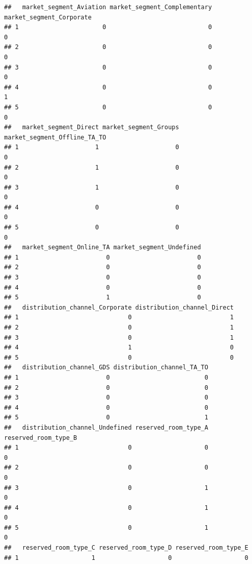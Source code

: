 \documentclass[
]{article}
\begin{document}
\begin{verbatim}
##   market_segment_Aviation market_segment_Complementary market_segment_Corporate
## 1                       0                            0                        0
## 2                       0                            0                        0
## 3                       0                            0                        0
## 4                       0                            0                        1
## 5                       0                            0                        0
##   market_segment_Direct market_segment_Groups market_segment_Offline_TA_TO
## 1                     1                     0                            0
## 2                     1                     0                            0
## 3                     1                     0                            0
## 4                     0                     0                            0
## 5                     0                     0                            0
##   market_segment_Online_TA market_segment_Undefined
## 1                        0                        0
## 2                        0                        0
## 3                        0                        0
## 4                        0                        0
## 5                        1                        0
##   distribution_channel_Corporate distribution_channel_Direct
## 1                              0                           1
## 2                              0                           1
## 3                              0                           1
## 4                              1                           0
## 5                              0                           0
##   distribution_channel_GDS distribution_channel_TA_TO
## 1                        0                          0
## 2                        0                          0
## 3                        0                          0
## 4                        0                          0
## 5                        0                          1
##   distribution_channel_Undefined reserved_room_type_A reserved_room_type_B
## 1                              0                    0                    0
## 2                              0                    0                    0
## 3                              0                    1                    0
## 4                              0                    1                    0
## 5                              0                    1                    0
##   reserved_room_type_C reserved_room_type_D reserved_room_type_E
## 1                    1                    0                    0

\end{verbatim}
\end{document}
